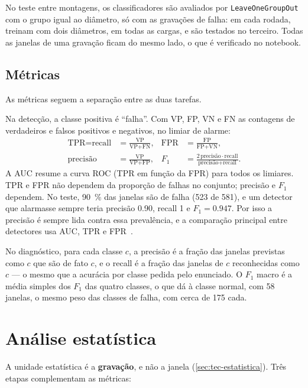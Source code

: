No teste entre montagens, os classificadores são avaliados por
\texttt{LeaveOneGroupOut} com o grupo igual ao diâmetro, só com as gravações de
falha: em cada rodada, treinam com dois diâmetros, em todas as cargas, e são
testados no terceiro. Todas as janelas de uma gravação ficam do mesmo lado, o que
é verificado no notebook.

\subsection{Métricas}
\label{sec:metricas}

As métricas seguem a separação entre as duas tarefas.

Na detecção, a classe positiva é ``falha''. Com VP, FP, VN e FN as
contagens de verdadeiros e falsos positivos e negativos, no limiar de alarme:
\begin{align}
  \text{TPR} = \text{recall} &= \frac{\text{VP}}{\text{VP}+\text{FN}}, &
  \text{FPR} &= \frac{\text{FP}}{\text{FP}+\text{VN}}, \\
  \text{precisão} &= \frac{\text{VP}}{\text{VP}+\text{FP}}, &
  F_1 &= \frac{2\,\text{precisão}\cdot\text{recall}}{\text{precisão}+\text{recall}}.
\end{align}
A AUC resume a curva ROC (TPR em função da FPR) para todos os limiares. TPR e FPR
não dependem da proporção de falhas no conjunto; precisão e $F_1$ dependem. No
teste, \SI{90}{\percent} das janelas são de falha (523 de 581), e um detector que
alarmasse sempre teria precisão \num{0.90}, recall 1 e $F_1 = \num{0.947}$. Por
isso a precisão é sempre lida contra essa prevalência, e a comparação principal
entre detectores usa AUC, TPR e FPR~\cite{hastie2009}.

No diagnóstico, para cada classe $c$, a precisão é a fração das janelas
previstas como $c$ que são de fato $c$, e o recall é a fração das janelas de $c$
reconhecidas como $c$ --- o mesmo que a acurácia por classe pedida pelo
enunciado. O $F_1$ macro é a média simples dos $F_1$ das quatro classes, o que dá
à classe normal, com 58 janelas, o mesmo peso das classes de falha, com cerca de
175 cada.

\section{Análise estatística}
\label{sec:met-estatistica}

A unidade estatística é a \textbf{gravação}, e não a janela
(\autoref{sec:tec-estatistica}). Três etapas complementam as métricas:

